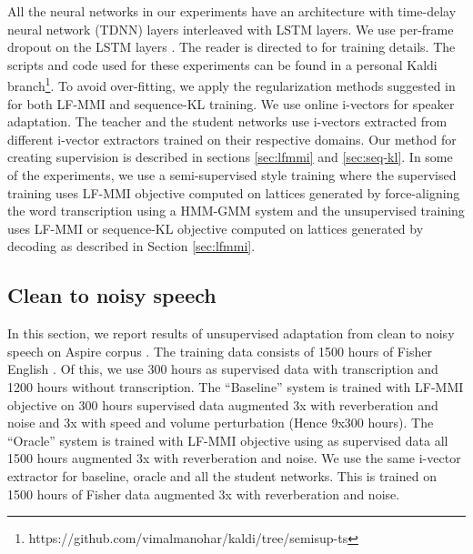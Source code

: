\documentclass{article}
\begin{document}
All the neural networks in our experiments have an architecture with time-delay
neural network (TDNN) \cite{tdnn,vijay-tdnn} layers interleaved with LSTM
\cite{sak2014lstmp} layers. We use per-frame dropout on the LSTM layers
\cite{cheng2017dropout}. The reader is directed to \cite{cheng2017dropout} 
for training details.  The scripts and code used for these experiments can be
found in a personal Kaldi
branch\footnote{https://github.com/vimalmanohar/kaldi/tree/semisup-ts}.
To avoid over-fitting, we apply the regularization methods suggested 
in \cite{chain} for both LF-MMI and sequence-KL training.
We use online i-vectors
\cite{karafiat-2011-ivector-adaptation,dehak2011ivectors,vijay_aspire} for
speaker adaptation. The teacher and the student networks use i-vectors extracted
from different i-vector extractors trained on their respective domains. Our
method for creating supervision is described in sections \ref{sec:lfmmi} and 
\ref{sec:seq-kl}. In some of the experiments, we use a semi-supervised style 
training where the supervised training uses LF-MMI objective computed on
lattices generated by force-aligning the word transcription using a HMM-GMM
system and the unsupervised training uses LF-MMI or sequence-KL objective
computed on lattices generated by decoding as described in Section
\ref{sec:lfmmi}. 

\subsection{Clean to noisy speech}
\label{sec:aspire_expts}

In this section, we report results of unsupervised adaptation from
clean to noisy speech on Aspire corpus \cite{aspire}. 
The training data consists of 
1500 hours of Fisher English \cite{fisher-corpus}. 
Of this, we use 300 hours as 
supervised data with transcription and 1200 hours without transcription.
% 
% 
The ``Baseline'' system is trained with LF-MMI objective on 300 hours supervised
data augmented 3x with reverberation and noise \cite{ko2017augmentation} and 3x
with speed and volume perturbation \cite{ko2015audio} (Hence 9x300 hours).
The ``Oracle'' system is trained with LF-MMI objective using as supervised data
all 1500 hours augmented 3x with reverberation and noise. We use the same
i-vector extractor for baseline, oracle and all the student networks. This is
trained on 1500 hours of Fisher data augmented 3x with reverberation and noise.
% 
% 
% 
%
% 
% 
% 
%
\end{document}
